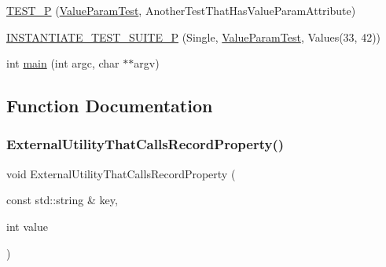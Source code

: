 \begin{DoxyCompactItemize}
\item 
\mbox{\hyperlink{googletest-master_2googletest_2test_2gtest__xml__output__unittest___8cc_a45f95818a41865db8e0209f3f536fab0}{T\+E\+S\+T\+\_\+P}} (\mbox{\hyperlink{class_value_param_test}{Value\+Param\+Test}}, Another\+Test\+That\+Has\+Value\+Param\+Attribute)
\item 
\mbox{\hyperlink{googletest-master_2googletest_2test_2gtest__xml__output__unittest___8cc_a1dca731adef470af2e5e1e2fa3b5df68}{I\+N\+S\+T\+A\+N\+T\+I\+A\+T\+E\+\_\+\+T\+E\+S\+T\+\_\+\+S\+U\+I\+T\+E\+\_\+P}} (Single, \mbox{\hyperlink{class_value_param_test}{Value\+Param\+Test}}, Values(33, 42))
\item 
int \mbox{\hyperlink{googletest-master_2googletest_2test_2gtest__xml__output__unittest___8cc_a3c04138a5bfe5d72780bb7e82a18e627}{main}} (int argc, char $\ast$$\ast$argv)
\end{DoxyCompactItemize}


\subsection{Function Documentation}
\mbox{\label{googletest-master_2googletest_2test_2gtest__xml__output__unittest___8cc_a8a5eb3769c1d7482bf69f3a03862c6a6}} 
\subsubsection{\texorpdfstring{ExternalUtilityThatCallsRecordProperty()}{ExternalUtilityThatCallsRecordProperty()}\hspace{0.1cm}{\footnotesize\ttfamily [1/2]}}
{\footnotesize\ttfamily void External\+Utility\+That\+Calls\+Record\+Property (\begin{DoxyParamCaption}\item[{const std\+::string \&}]{key,  }\item[{int}]{value }\end{DoxyParamCaption})}

\mbox{\label{googletest-master_2googletest_2test_2gtest__xml__output__unittest___8cc_a88d769551f5ca79a6668f6ef64a1abdd}} 
